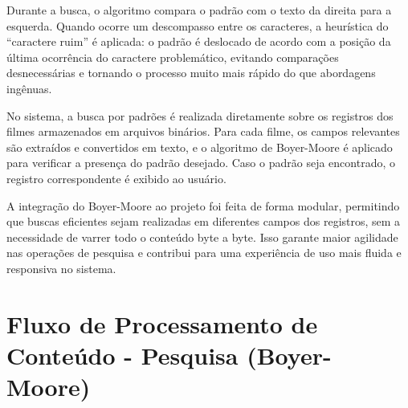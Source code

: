 \documentclass[12pt]{article}
\begin{document}
Durante a busca, o algoritmo compara o padrão com o texto da direita para a esquerda. Quando ocorre um descompasso entre os caracteres, a heurística do “caractere ruim” é aplicada: o padrão é deslocado de acordo com a posição da última ocorrência do caractere problemático, evitando comparações desnecessárias e tornando o processo muito mais rápido do que abordagens ingênuas.

No sistema, a busca por padrões é realizada diretamente sobre os registros dos filmes armazenados em arquivos binários. Para cada filme, os campos relevantes são extraídos e convertidos em texto, e o algoritmo de Boyer-Moore é aplicado para verificar a presença do padrão desejado. Caso o padrão seja encontrado, o registro correspondente é exibido ao usuário.

A integração do Boyer-Moore ao projeto foi feita de forma modular, permitindo que buscas eficientes sejam realizadas em diferentes campos dos registros, sem a necessidade de varrer todo o conteúdo byte a byte. Isso garante maior agilidade nas operações de pesquisa e contribui para uma experiência de uso mais fluida e responsiva no sistema.

\section*{Fluxo de Processamento de Conteúdo - Pesquisa (Boyer-Moore)} 
\begin{center} 
\end{center}
\end{document}
